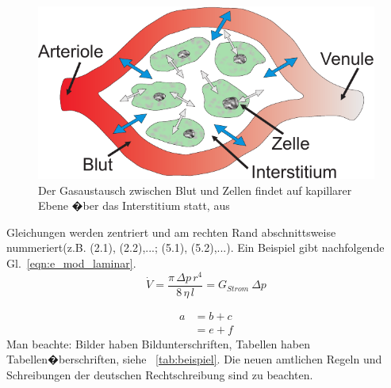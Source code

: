 \begin{figure}[!ht]
  \centering
   \includegraphics[scale=.75]{images/beispiel1}
  \caption{Der Gasaustausch zwischen Blut und Zellen findet auf kapillarer Ebene �ber das Interstitium statt, aus \cite{walter2002}}
  \label{fig:beispiel1}
\end{figure}


Gleichungen werden zentriert und am rechten Rand abschnittsweise nummeriert(z.B. (2.1), (2.2),...; (5.1),
(5.2),...). Ein Beispiel gibt nachfolgende Gl.~\ref{eqn:e_mod_laminar}.
\begin{equation}\label{eqn:e_mod_laminar}
  \dot V = \frac{\pi \, \Delta p \, r^4}{8 \, \eta \, l} =
  G_{Strom} \: \Delta p
\end{equation}

\begin{equation}\label{erster}
    \begin{split}
    a &= b +c \\
      &= e + f
\end{split}
\end{equation}
Man beachte: Bilder haben Bildunterschriften, Tabellen haben Tabellen�berschriften, siehe
\tablename~\ref{tab:beispiel}. Die neuen amtlichen Regeln und Schreibungen der deutschen
Rechtschreibung sind zu beachten.


